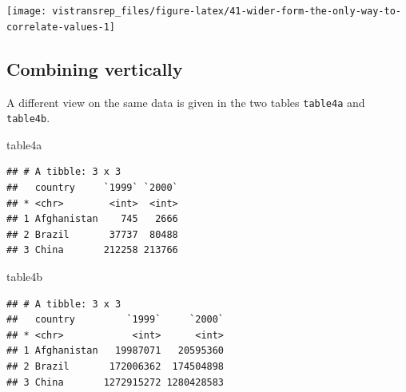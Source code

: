 \documentclass[]{book}
\newenvironment{Shaded}{}{}
\newcommand{\DataTypeTok}[1]{#1}
\newcommand{\KeywordTok}[1]{\textcolor[rgb]{0.00,0.00,1.00}{#1}}
\newcommand{\NormalTok}[1]{#1}
\newcommand{\OperatorTok}[1]{#1}
\newcommand{\StringTok}[1]{\textcolor[rgb]{0.00,0.50,0.50}{#1}}
\begin{document}
\begin{Shaded}
\end{Shaded}

\begin{flushright}\texttt{[image: vistransrep\_files/figure-latex/41-wider-form-the-only-way-to-correlate-values-1]} \end{flushright}

\hypertarget{combining-vertically}{%
\subsection{Combining vertically}\label{combining-vertically}}

A different view on the same data is given in the two tables \texttt{table4a} and \texttt{table4b}.

\begin{Shaded}
\begin{Highlighting}[]
\NormalTok{table4a}
\end{Highlighting}
\end{Shaded}

\begin{verbatim}
## # A tibble: 3 x 3
##   country     `1999` `2000`
## * <chr>        <int>  <int>
## 1 Afghanistan    745   2666
## 2 Brazil       37737  80488
## 3 China       212258 213766
\end{verbatim}

\begin{Shaded}
\begin{Highlighting}[]
\NormalTok{table4b}
\end{Highlighting}
\end{Shaded}

\begin{verbatim}
## # A tibble: 3 x 3
##   country         `1999`     `2000`
## * <chr>            <int>      <int>
## 1 Afghanistan   19987071   20595360
## 2 Brazil       172006362  174504898
## 3 China       1272915272 1280428583
\end{verbatim}
\end{document}
